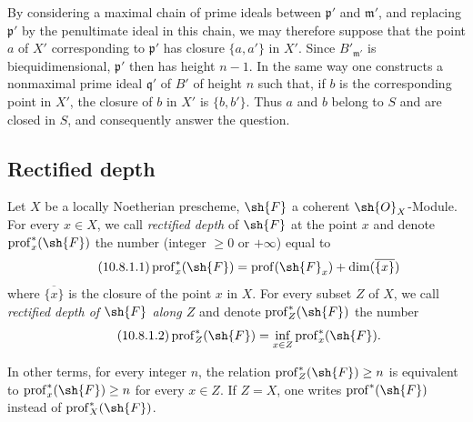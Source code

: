 \begin{env}[10.7.3]
By considering a maximal chain of prime ideals between $\mathfrak{p}'$ and $\mathfrak{m}'$, and replacing $\mathfrak{p}'$ by the penultimate ideal in this chain, we may therefore suppose that the point $a$ of $X'$ corresponding to $\mathfrak{p}'$ has closure $\{a,a'\}$ in $X'$.
Since $B'_{\mathfrak{m}'}$ is biequidimensional, $\mathfrak{p}'$ then has height $n-1$.
In the same way one constructs a nonmaximal prime ideal $\mathfrak{q}'$ of $B'$ of height $n$ such that, if $b$ is the corresponding point in $X'$, the closure of $b$ in $X'$ is $\{b,b'\}$.
Thus $a$ and $b$ belong to $S$ and are closed in $S$, and consequently answer the question.
\end{env}

\subsection{Rectified depth}
\label{subsection:IV.10.8}

\begin{definition}[10.8.1]
\label{IV.10.8.1}
Let $X$ be a locally Noetherian prescheme, $\sh{F}$ a coherent $\sh{O}_X$-Module.
For every $x\in X$, we call \emph{rectified depth} of $\sh{F}$ at the point $x$ and denote $\operatorname{prof}^*_x(\sh{F})$ the number (integer $\geq 0$ or $+\infty$) equal to
\begin{equation}
\label{IV.10.8.1.1}
\tag{10.8.1.1}
\operatorname{prof}^*_x(\sh{F})=\operatorname{prof}(\sh{F}_x)+\dim(\overline{\{x\}})
\end{equation}
where $\overline{\{x\}}$ is the closure of the point $x$ in $X$.
For every subset $Z$ of $X$, we call \emph{rectified depth of $\sh{F}$ along $Z$} and denote $\operatorname{prof}^*_Z(\sh{F})$ the number
\begin{equation}
\label{IV.10.8.1.2}
\tag{10.8.1.2}
\operatorname{prof}^*_Z(\sh{F})=\inf_{x\in Z}\operatorname{prof}^*_x(\sh{F}).
\end{equation}
\end{definition}

In other terms, for every integer $n$, the relation $\operatorname{prof}^*_Z(\sh{F})\geq n$ is equivalent to $\operatorname{prof}^*_x(\sh{F})\geq n$ for every $x\in Z$.
If $Z=X$, one writes $\operatorname{prof}^*(\sh{F})$ instead of $\operatorname{prof}^*_X(\sh{F})$.


